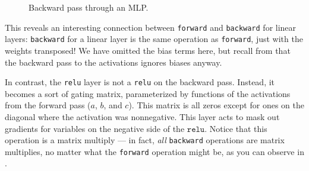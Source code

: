 \begin{figure}[h]
{
    }
    \caption{Backward pass through an MLP.}
    \label{fig:backpropagation:backward_pass_MLP}
\end{figure}

This reveals an interesting connection between \texttt{forward} and \texttt{backward} for linear layers: \texttt{backward} for a linear layer is the same operation as \texttt{forward}, just with the weights transposed! We have omitted the bias terms here, but recall from \eqn{\ref{eqn:backpropagation:linear_backward_costgrad}} that the backward pass to the activations ignores biases anyway.

In contrast, the \texttt{relu} layer is not a \texttt{relu} on the backward pass. Instead, it becomes a sort of gating matrix, parameterized by functions of the activations from the forward pass ($a$, $b$, and $c$). This matrix is all zeros except for ones on the diagonal where the activation was nonnegative. This layer acts to mask out gradients for variables on the negative side of the $\texttt{relu}$. Notice that this operation is a matrix multiply — in fact, \textit{all} \texttt{backward} operations are matrix multiplies, no matter what the \texttt{forward} operation might be, as you can observe in \algref{\ref{alg:backpropagation:backprop_for_chains}}.%


